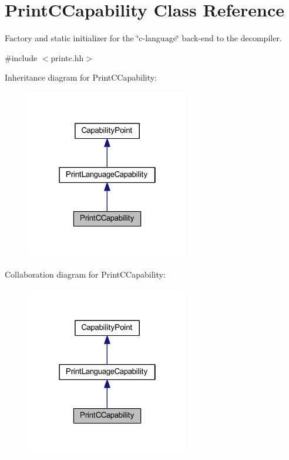 \hypertarget{class_print_c_capability}{}\section{Print\+C\+Capability Class Reference}
\label{class_print_c_capability}


Factory and static initializer for the \char`\"{}c-\/language\char`\"{} back-\/end to the decompiler.  




{\ttfamily \#include $<$printc.\+hh$>$}



Inheritance diagram for Print\+C\+Capability\+:
\nopagebreak
\begin{figure}[H]
\begin{center}
\leavevmode
\includegraphics[width=202pt]{class_print_c_capability__inherit__graph}
\end{center}
\end{figure}


Collaboration diagram for Print\+C\+Capability\+:
\nopagebreak
\begin{figure}[H]
\begin{center}
\leavevmode
\includegraphics[width=202pt]{class_print_c_capability__coll__graph}
\end{center}
\end{figure}
